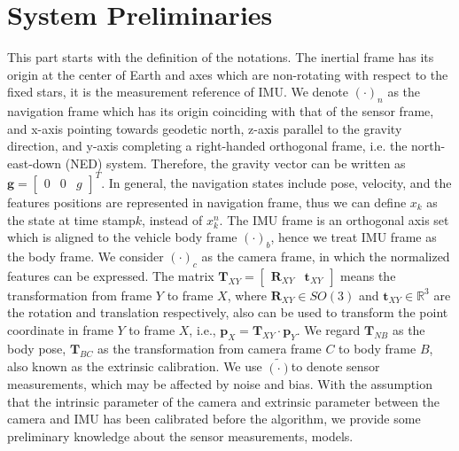 \documentclass[journal,article,submit,moreauthors,pdftex]{Definitions/mdpi}
\begin{document}
\section{System Preliminaries}
This part starts with the definition of the notations. The inertial frame has its origin at the center of Earth and axes which are non-rotating with respect to the fixed stars, it is the measurement reference of IMU. We denote $\left( \cdot\right)_n$ as the navigation frame which has its origin coinciding with that of the sensor frame, and x-axis pointing towards geodetic north, z-axis parallel to the gravity direction, and y-axis completing a right-handed orthogonal frame, i.e. the north-east-down (NED) system. Therefore, the gravity vector can be written as $\boldsymbol{g} = \left[\begin{matrix} 0 & 0 & g \end{matrix}\right]^T$. In general, the navigation states include pose, velocity, and the features positions are represented in navigation frame, thus we can define $x_k$ as the state at time stamp$k$, instead of $x_k^n$. The IMU frame is an orthogonal axis set which is aligned to the vehicle body frame $\left( \cdot\right)_b$, hence we treat IMU frame as the body frame. We consider $\left( \cdot\right)_{c}$ as the camera frame, in which the normalized features can be expressed. The matrix $\boldsymbol{T}_{XY} = \left[\begin{matrix} \boldsymbol{R}_{XY} & \boldsymbol{t}_{XY} \end{matrix}\right]$ means the transformation from frame $Y$ to frame $X$, where $\boldsymbol{R}_{XY} \in SO(3)$ and $\boldsymbol{t}_{XY} \in \mathbb{R}^3$ are the rotation and translation respectively,  also can be used to transform the point coordinate in frame $Y$ to frame $X$, i.e., $\boldsymbol{p}_X = \boldsymbol{T}_{XY} \cdot \boldsymbol{p}_Y$. We regard $\boldsymbol{T}_{NB}$ as the body pose, $\boldsymbol{T}_{BC}$ as the transformation from camera frame $C$ to body frame $B$, also known as the extrinsic calibration. We use $\widetilde{(\cdot)}$to denote sensor measurements, which may be affected by noise and bias. With the assumption that the intrinsic parameter of the camera and extrinsic parameter between the camera and IMU has been calibrated before the algorithm, we provide some preliminary knowledge about the sensor measurements, models.
\end{document}
